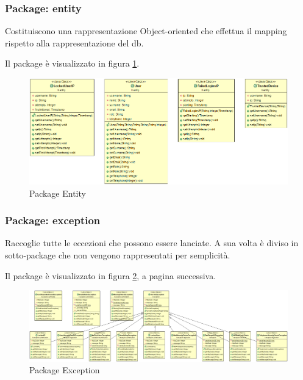 \subsubsection{Package: \textbf{entity}}

Costituiscono una rappresentazione Object-oriented che effettua il mapping rispetto alla rappresentazione del db.

Il package è visualizzato in figura \ref{gfx:dependencies_entity}.

\begin{figure}[!htbp]
	\centering
	\includegraphics[scale = .4]{img/dependencies_entity}
	\caption{Package Entity}
	\label{gfx:dependencies_entity}
\end{figure}

\subsubsection{Package: \textbf{exception}}

Raccoglie tutte le eccezioni che possono essere lanciate. A sua volta è diviso in sotto-package che non vengono rappresentati per semplicità.

Il package è visualizzato in figura \ref{gfx:dependencies_exception}, a pagina successiva.

\tiny 
\begin{landscape}
\begin{center}
\vspace*{\fill}
\begin{figure}[!htbp]
	\centering
	\includegraphics[scale = .3]{img/dependencies_exception}
	\caption{Package Exception}
	\label{gfx:dependencies_exception}
\end{figure}
\vspace*{\fill}

\end{center}	

\end{landscape}%
\normalsize
